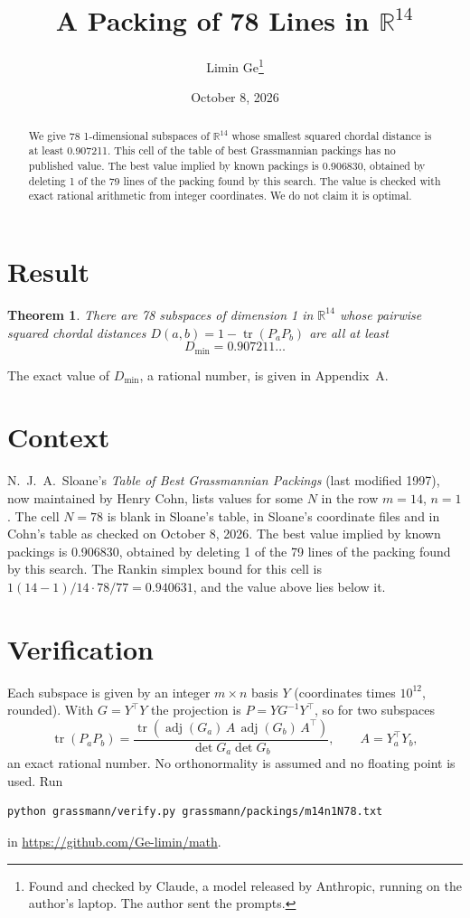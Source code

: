 \documentclass[11pt,a4paper]{article}
\title{A Packing of 78 Lines in $\mathbb{R}^{14}$}
\author{Limin Ge\thanks{Found and checked by Claude, a model released by Anthropic, running on the author's laptop. The author sent the prompts.}}
\date{October 8, 2026}
\newtheorem*{theorem}{Theorem}
\begin{document}
\maketitle
\begin{abstract}
We give 78 1-dimensional subspaces of $\mathbb{R}^{14}$ whose smallest squared chordal distance is at least 0.907211. This cell of the table of best Grassmannian packings has no published value. The best value implied by known packings is 0.906830, obtained by deleting 1 of the 79 lines of the packing found by this search. The value is checked with exact rational arithmetic from integer coordinates. We do not claim it is optimal.
\end{abstract}

\section{Result}
\begin{theorem}
There are 78 subspaces of dimension 1 in $\mathbb{R}^{14}$ whose pairwise squared chordal distances $D(a,b) = 1 - \operatorname{tr}(P_aP_b)$ are all at least
\[ D_{\min} = 0.907211\ldots \]
\end{theorem}
The exact value of $D_{\min}$, a rational number, is given in Appendix~A.


\section{Context}
N.~J.~A.~Sloane's \emph{Table of Best Grassmannian Packings} (last modified 1997), now maintained by Henry Cohn, lists values for some $N$ in the row $m=14$, $n=1$. The cell $N=78$ is blank in Sloane's table, in Sloane's coordinate files and in Cohn's table as checked on October 8, 2026. The best value implied by known packings is 0.906830, obtained by deleting 1 of the 79 lines of the packing found by this search. The Rankin simplex bound for this cell is $1(14-1)/14\cdot 78/77 = 0.940631$, and the value above lies below it.


\section{Verification}
Each subspace is given by an integer $m\times n$ basis $Y$ (coordinates times $10^{12}$, rounded). With $G=Y^\top Y$ the projection is $P=YG^{-1}Y^\top$, so for two subspaces
\[ \operatorname{tr}(P_aP_b)=\frac{\operatorname{tr}(\operatorname{adj}(G_a)\,A\,\operatorname{adj}(G_b)\,A^\top)}{\det G_a\det G_b},\qquad A=Y_a^\top Y_b, \]
an exact rational number. No orthonormality is assumed and no floating point is used. Run
\begin{verbatim}
python grassmann/verify.py grassmann/packings/m14n1N78.txt
\end{verbatim}
in \url{https://github.com/Ge-limin/math}.
\end{document}
